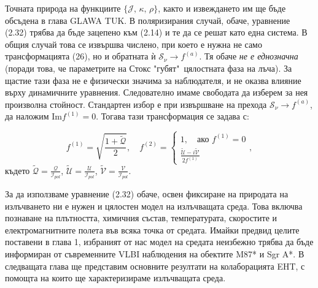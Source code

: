 \noindent Точната природа на функциите $\{\mathcal{J},\,\mathcal{\kappa},\,\mathcal{\rho}\}$, както и извеждането им ще бъде обсъдена в глава {\color{red} GLAWA TUK}. В поляризирания случай, обаче, уравнение (2.32) трябва да бъде зацепено към (2.14) и те да се решат като една система. В общия случай това се извършва числено, при което е нужна не само трансформацията (26), но и обратната ѝ $\mathcal{S}_\nu\rightarrow f^{(a)}$. Тя обаче \emph{не е еднозначна} (поради това, че параметрите на Стокс "губят"$\,$ цялостната фаза на лъча). За щастие тази фаза не е физически значима за наблюдателя, и не оказва влияние върху динамичните уравнения. Следователно имаме свободата да изберем за нея произволна стойност. Стандартен избор е при извършване на прехода $\mathcal{S}_\nu\rightarrow f^{(a)}$, да наложим $\text{Im}{f^{(1)}} = 0$. Тогава тази трансформация се задава с:

\begin{equation}
	f^{(1)} = \sqrt{\frac{1 + \tilde{\mathcal{Q}}}{2}}, \quad f^{(2)} = \begin{cases}
		1,\quad \text{ако}\,\,f^{(1)} = 0 \\
		\frac{\tilde{\mathcal{U}} - i\tilde{\mathcal{V}}}{2f^{(1)}}
	\end{cases},
\end{equation}
където $\tilde{\mathcal{Q}} = \frac{\mathcal{Q}}{\mathcal{I}_{pol}}$, $\tilde{\mathcal{U}} = \frac{\mathcal{U}}{\mathcal{I}_{pol}}$, $\tilde{\mathcal{V}} = \frac{\mathcal{V}}{\mathcal{I}_{pol}}$.\\

\noindent За да използваме уравнение (2.32) обаче, освен фиксиране на природата на излъчването ни е нужен и цялостен модел на излъчващата среда. Това включва познаване на плътността, химичния състав, температурата, скоростите и електромагнитните полета във всяка точка от средата. Имайки предвид целите поставени в глава 1, избраният от нас модел на средата неизбежно трябва да бъде информиран от съвременните VLBI наблюдения на обектите M87* и Sgr A*. В следващата глава ще представим основните резултати на колаборацията EHT, с помощта на които ще характеризираме излъчващата среда.
\lfoot{}

